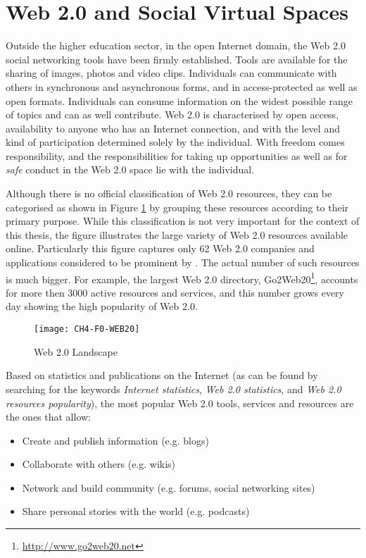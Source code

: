 \section{Web 2.0 and Social Virtual Spaces}
Outside the higher education sector, in the open Internet domain, the Web 2.0
social networking tools have been firmly established. Tools are available for
the sharing of images, photos and video clips. Individuals can communicate with
others in synchronous and asynchronous forms, and in access-protected as well as
open formats. Individuals can consume information on the widest possible range
of topics and can as well contribute. Web 2.0 is characterised by open access,
availability to anyone who has an Internet connection, and with the level and
kind of participation determined solely by the individual. With freedom comes
responsibility, and the responsibilities for taking up opportunities as well as
for \textit{safe} conduct in the Web 2.0 space lie with the individual.

Although there is no official classification of Web 2.0 resources, they can be
categorised as shown in Figure \ref{fig:web20l} by grouping these resources
according to their primary purpose. While this classification is not very
important for the context of this thesis, the figure illustrates the large
variety of Web 2.0 resources available online. Particularly this figure captures
only 62 Web 2.0 companies and applications considered to be prominent by
\citet{Dawson2007}. The actual number of such resources is much bigger. For
example, the largest Web 2.0 directory,
Go2Web20\footnote{\url{http://www.go2web20.net}}, accounts for more then 3000
active resources and services, and this number grows every day showing the high
popularity of Web 2.0.

\begin{figure}[htb]
\centering
\texttt{[image: CH4-F0-WEB20]}
\caption[Web 2.0 Landscape]{Web 2.0 Landscape \citep{Dawson2007}}
\label{fig:web20l}
\end{figure}

Based on statistics and publications on the Internet (as can be found by
searching for the keywords \textit{Internet statistics}, \textit{Web 2.0 statistics}, and \textit{Web 2.0
resources popularity}), the most popular Web 2.0 tools, services and resources
are the ones that allow:

\begin{itemize}
  \item Create and publish information (e.g. blogs) 
  \item Collaborate with others (e.g. wikis)
  \item Network and build community (e.g. forums, social networking sites)
  \item Share personal stories with the world (e.g. podcasts)
\end{itemize}


